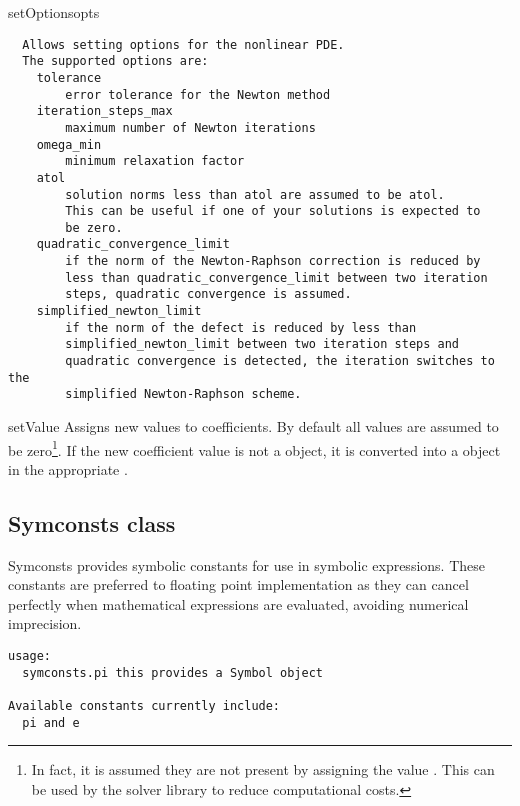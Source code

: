 \begin{methoddesc}[NonlinearPDE]{setOptions}{opts}
\begin{verbatim}
  Allows setting options for the nonlinear PDE.
  The supported options are:
    tolerance
        error tolerance for the Newton method
    iteration_steps_max
        maximum number of Newton iterations
    omega_min
        minimum relaxation factor
    atol
        solution norms less than atol are assumed to be atol.
        This can be useful if one of your solutions is expected to
        be zero.
    quadratic_convergence_limit
        if the norm of the Newton-Raphson correction is reduced by
        less than quadratic_convergence_limit between two iteration
        steps, quadratic convergence is assumed.
    simplified_newton_limit
        if the norm of the defect is reduced by less than
        simplified_newton_limit between two iteration steps and
        quadratic convergence is detected, the iteration switches to the
        simplified Newton-Raphson scheme.
\end{verbatim}

\end{methoddesc}
\begin{methoddesc}[NonlinearPDE]{setValue}{
}
Assigns new values to coefficients. By default all values are assumed to be
zero\footnote{In fact, it is assumed they are not present by assigning the
value . This can be used by the solver library to reduce
computational costs.}.
If the new coefficient value is not a \Data object, it is converted into a
\Data object in the appropriate \FunctionSpace.
\end{methoddesc}

\subsection{Symconsts class}
Symconsts provides symbolic constants for use in symbolic expressions. These constants are preferred to floating point implementation as they can cancel perfectly when mathematical expressions are evaluated, avoiding numerical imprecision. 
\begin{verbatim}
usage:
  symconsts.pi this provides a Symbol object

Available constants currently include:
  pi and e 
\end{verbatim}